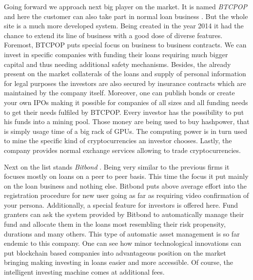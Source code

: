 \documentclass[a4paper,12pt,twoside,openany]{report}
\begin{document}
Going forward we approach next big player on the market. It is named \textit{BTCPOP} and here the customer can also take part in normal loan business \cite{btcpop}. But the whole site is a much more developed system. Being created in the year 2014 it had the chance to extend its line of business with a good dose of diverse features. Foremost, BTCPOP puts special focus on business to business contracts. We can invest in specific companies with funding their loans requiring much bigger capital and thus needing additional safety mechanisms. Besides, the already present on the market collaterals of the loans and supply of personal information for legal purposes the investors are also secured by insurance contracts which are maintained by the company itself. Moreover, one can publish bonds or create your own IPOs making it possible for companies of all sizes and all funding needs to get their needs fulfiled by BTCPOP. Every investor has the possibility to put his funds into a mining pool. Those money are being used to buy hashpower, that is simply usage time of a big rack of GPUs. The computing power is in turn used to mine the specific kind of cryptocurrencies an investor chooses. Lastly, the company provides normal exchange services allowing to trade cryptocurrencies.

Next on the list stands \textit{Bitbond} \cite{bitbond}. Being very similar to the previous firms it focuses mostly on loans on a peer to peer basis. This time the focus it put mainly on the loan business and nothing else. Bitbond puts above average effort into the registration procedure for new user going as far as requiring video confirmation of your persona. Additionally, a special feature for investors is offered here. Fund granters can ask the system provided by Bitbond to automatically manage their fund and allocate them in the loans most resembling their risk propensity, durations and many others. This type of automatic asset management is so far endemic to this company. One can see how minor technological innovations can put blockchain based companies into advantageous position on the market bringing making investing in loans easier and more accessible. Of course, the intelligent investing machine comes at additional fees.
\end{document}
